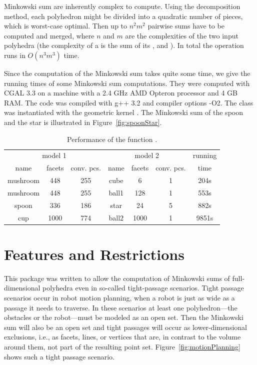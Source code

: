 Minkowski sum are inherently complex to compute. Using the
decomposition method, each polyhedron might be divided into a
quadratic number of pieces, which is worst-case optimal. Then up to
$n^2m^2$ pairwise sums have to be computed and merged, where $n$ and
$m$ are the complexities of the two input polyhedra (the complexity of
a  is the sum of its ,
 and ). In total the operation runs in
$O(n^3m^3)$ time.

Since the computation of the Minkowski sum takes quite some time, we
give the running times of some Minkowski sum computations. They were
computed with CGAL 3.3 on a machine with a 2.4 GHz AMD Opteron
processor and 4 GB RAM. The code was compiled with
g++ 3.2 and compiler options -O2. The
 class was instantiated with the geometric
kernel . The Minkowski sum of the spoon
and the star is illustrated in Figure~\ref{fig:spoonStar}.

\begin{table}[h]
\begin{center}
\begin{tabular}{|ccc|ccc|c|}
\hline
\multicolumn{3}{|c|}{model 1} & \multicolumn{3}{|c|}{model 2} & running \\
name & facets & conv. pcs. & name & facets & conv. pcs. & time \\ 
\hline
mushroom & 448 & 255 & cube & 6 & 1 & 204s \\
mushroom & 448 & 255 & ball1 & 128 & 1 & 553s \\
spoon & 336 & 186 & star & 24 & 5 & 882s \\
cup & 1000 & 774 & ball2 & 1000 & 1 & 9851s \\
\hline
\end{tabular}
\caption{Performance of the function .}
\end{center}
\end{table}

\section{Features and Restrictions}
\label{sectionMinkowskiSum_3Restrictions}

This package was written to allow the computation of Minkowski sums of
full-dimensional polyhedra even in so-called tight-passage scenarios.
Tight passage scenarios occur in robot motion planning, when a robot
is just as wide as a passage it needs to traverse. In these scenarios
at least one polyhedron---the obstacles or the robot---must be modeled
as an open set. Then the Minkowski sum will also be an open set and
tight passages will occur as lower-dimensional exclusions, i.e., as
facets, lines, or vertices that are, in contrast to the volume around
them, not part of the resulting point
set. Figure~\ref{fig:motionPlanning} shows such a tight passage
scenario.

